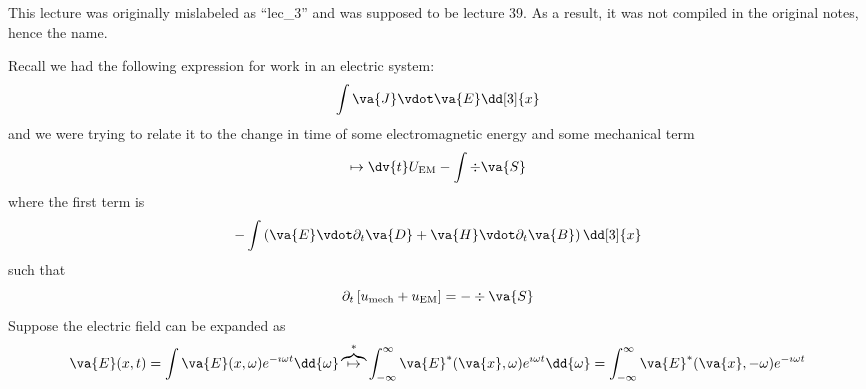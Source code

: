\documentclass[a4paper,twoside,master.tex]{subfiles}
\begin{document}

This lecture was originally mislabeled as ``lec\_3'' and was supposed to be lecture 39. As a result, it was not compiled in the original notes, hence the name.

Recall we had the following expression for work in an electric system:
\begin{equation}
    \int \va{J} \vdot \va{E} \dd[3]{x}
\end{equation}
and we were trying to relate it to the change in time of some electromagnetic energy and some mechanical term
\begin{equation}
    \mapsto \dv{t} U_{\text{EM}} - \int \div{ \va{S}}
\end{equation}
where the first term is
\begin{equation}
    - \int \left( \va{E} \vdot \partial_t \va{D} + \va{H} \vdot \partial_t \va{B} \right) \dd[3]{x}
\end{equation}
such that
\begin{equation}
    \partial_t \left[ u_{\text{mech}} + u_{\text{EM}} \right] = - \div{ \va{S}}
\end{equation}
Suppose the electric field can be expanded as
\begin{equation}
    \va{E}(x,t) = \int \va{E}(x, \omega) e^{- \imath \omega t} \dd{\omega} \overbrace{\mapsto}^{*} \int_{- \infty}^{\infty} \va{E}^*( \va{x}, \omega) e^{\imath \omega t} \dd{\omega} = \int_{- \infty}^{\infty} \va{E}^*( \va{x}, - \omega) e^{- \imath \omega t}
\end{equation}
\end{document}
